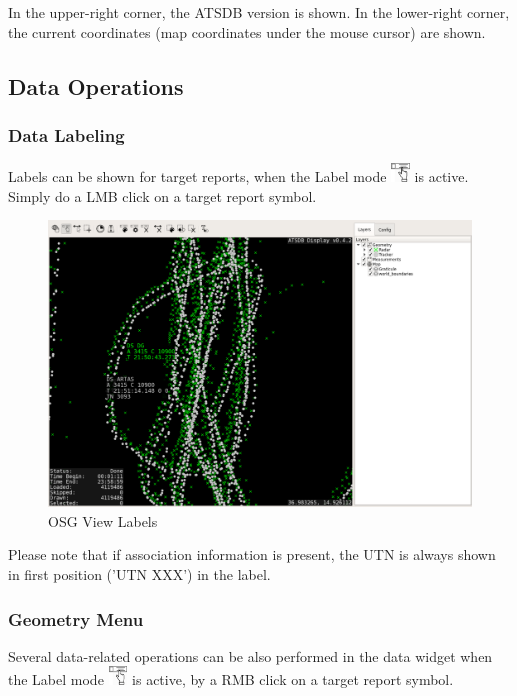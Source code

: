 In the upper-right corner, the ATSDB version is shown. In the lower-right corner, the current coordinates (map coordinates under the mouse cursor) are shown. 

\subsection{Data Operations}

\subsubsection{Data Labeling}

Labels can be shown for target reports, when the Label mode \includegraphics[width=0.5cm,frame]{../../data/icons/label_action.png} is active. Simply do a LMB click on a target report symbol.

\begin{figure}[H]
    \hspace*{-2cm}
    \includegraphics[width=18cm,frame]{../screenshots/osgview_labels.png}
  \caption{OSG View Labels}
\end{figure}

Please note that if association information is present, the UTN is always shown in first position ('UTN XXX') in the label.

\subsubsection{Geometry Menu}

Several data-related operations can be also performed in the data widget when the Label mode \includegraphics[width=0.5cm,frame]{../../data/icons/label_action.png} is active, by a RMB click on a target report symbol.

